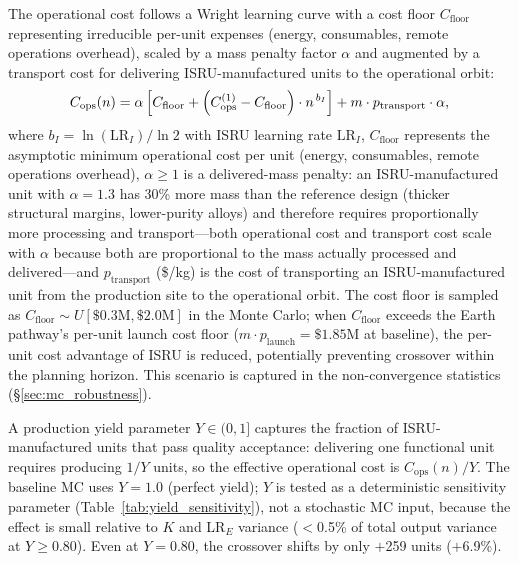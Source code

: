 \documentclass[5p,twocolumn]{elsarticle}
\begin{document}
The operational cost follows a Wright learning curve with a cost floor $C_{\mathrm{floor}}$ representing irreducible per-unit expenses (energy, consumables, remote operations overhead), scaled by a mass penalty factor $\alpha$ and augmented by a transport cost for delivering ISRU-manufactured units to the operational orbit:
\begin{equation}\small
  C_{\mathrm{ops}}(n) = \alpha \left[ C_{\mathrm{floor}} + \left(C_{\mathrm{ops}}^{(1)} - C_{\mathrm{floor}}\right) \cdot n^{\,b_I} \right] + m \cdot p_{\mathrm{transport}} \cdot \alpha,
  \label{eq:isru_ops}
\end{equation}
where $b_I = \ln(\mathrm{LR}_I)/\ln 2$ with ISRU learning rate $\mathrm{LR}_I$, $C_{\mathrm{floor}}$ represents the asymptotic minimum operational cost per unit (energy, consumables, remote operations overhead), $\alpha \geq 1$ is a delivered-mass penalty: an ISRU-manufactured unit with $\alpha = 1.3$ has 30\% more mass than the reference design (thicker structural margins, lower-purity alloys) and therefore requires proportionally more processing and transport---both operational cost and transport cost scale with $\alpha$ because both are proportional to the mass actually processed and delivered---and $p_{\mathrm{transport}}$ (\$/kg) is the cost of transporting an ISRU-manufactured unit from the production site to the operational orbit. The cost floor is sampled as $C_{\mathrm{floor}} \sim U[\$0.3\text{M}, \$2.0\text{M}]$ in the Monte Carlo; when $C_{\mathrm{floor}}$ exceeds the Earth pathway's per-unit launch cost floor ($m \cdot p_{\mathrm{launch}} = \$1.85$M at baseline), the per-unit cost advantage of ISRU is reduced, potentially preventing crossover within the planning horizon. This scenario is captured in the non-convergence statistics (\S\ref{sec:mc_robustness}).

A production yield parameter $Y \in (0, 1]$ captures the fraction of ISRU-manufactured units that pass quality acceptance: delivering one functional unit requires producing $1/Y$ units, so the effective operational cost is $C_{\mathrm{ops}}(n)/Y$. The baseline MC uses $Y = 1.0$ (perfect yield); $Y$ is tested as a deterministic sensitivity parameter (Table~\ref{tab:yield_sensitivity}), not a stochastic MC input, because the effect is small relative to $K$ and LR$_E$ variance ($<$0.5\% of total output variance at $Y \geq 0.80$). Even at $Y = 0.80$, the crossover shifts by only $+$259 units ($+$6.9\%).
\end{document}
